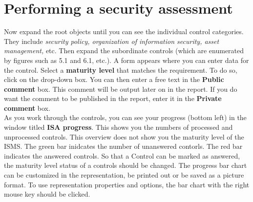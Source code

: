 \documentclass[a4paper,10pt]{book}
\begin{document}
\section{Performing a security assessment}
Now expand the root objects until you can see the individual control categories. They include {\em security policy, organization of information security, asset management,}
etc. Then expand the subordinate controls (which are enumerated by figures such as 5.1 and 6.1, etc.). A form appears where you can enter data for the control. Select a
\textbf{maturity level} that matches the requirement. To do so, click on the drop-down box. You can then enter a free text in the
\textbf{Public comment} box. This comment will be output later on in the report. If you do want the comment to be published in the report, enter it in the
\textbf{Private comment} box.
\newline\\
As you work through the controls, you can see your progress (bottom left) in the window titled \textbf{ISA progress}.
This shows you the numbers of processed and unprocessed controls. This overview does not show you the maturity level of the ISMS.
The green bar inidcates the number of unanswered contorls. The red bar indicates the answered controls. So that a Control can be marked as answered,
the maturity level status of a controls should be changed. The progress bar chart can be customized in the representation, be printed out or be saved as a picture format.
To use representation properties and options, the bar chart with the right mouse key should be clicked.
\end{document}
